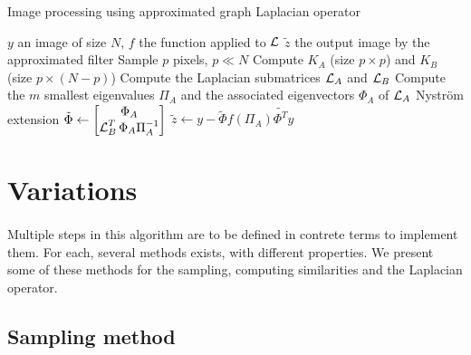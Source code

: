 \begin{algorithm}[H]
 \caption{Image processing using approximated graph Laplacian operator}
 \begin{algorithmic}
  \REQUIRE \(y\) an image of size \(N\), \(f\) the function applied to \(\operatorname{\mathcal{L}}\)
  \ENSURE \(\tilde{z}\) the output image by the approximated filter
  \STATE {}
  \STATE Sample \(p\) pixels, \(p \ll N\)
  \STATE {}
  \STATE Compute \(K_A\) (size \(p \times p\)) and \(K_B\) (size \(p \times (N-p)\))
  \STATE Compute the Laplacian submatrices \(\operatorname{\mathcal{L}}_A\) and \(\operatorname{\mathcal{L}}_B\)
  \STATE {}
  \STATE Compute the \(m\) smallest eigenvalues \(\Pi_A\) and the associated eigenvectors \(\Phi_A\) of \(\operatorname{\mathcal{L}}_A\)
  \STATE Nystr\"om extension \(\tilde{\Phi} \leftarrow \begin{bmatrix} \Phi_A \\ \operatorname{\mathcal{L}}_B^T \Phi_A \Pi_A^{-1} \end{bmatrix}\)
  \STATE {}
  \STATE \(\tilde{z} \leftarrow y - \tilde{\Phi} f(\Pi_A) \tilde{\Phi^T} y\)
 \end{algorithmic}
\end{algorithm}

\section{Variations}

\paragraph{}
Multiple steps in this algorithm are to be defined in contrete terms to implement them.
For each, several methods exists, with different properties.
We present some of these methods for the sampling, computing similarities and the Laplacian operator.

\subsection{Sampling method}

